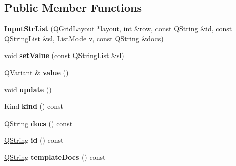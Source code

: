 \subsection*{Public Member Functions}
\begin{DoxyCompactItemize}
\item 
\mbox{\label{class_input_str_list_a2ff2afcbcd50e8425f367f2888832564}} 
{\bfseries Input\+Str\+List} (Q\+Grid\+Layout $\ast$layout, int \&row, const \mbox{\hyperlink{class_q_string}{Q\+String}} \&id, const \mbox{\hyperlink{class_q_string_list}{Q\+String\+List}} \&sl, List\+Mode v, const \mbox{\hyperlink{class_q_string}{Q\+String}} \&docs)
\item 
\mbox{\label{class_input_str_list_a353a46afd90e0897ba6dce7a13d844d8}} 
void {\bfseries set\+Value} (const \mbox{\hyperlink{class_q_string_list}{Q\+String\+List}} \&sl)
\item 
\mbox{\label{class_input_str_list_a60756f0f9f3fc4303a7c17550ae81a46}} 
Q\+Variant \& {\bfseries value} ()
\item 
\mbox{\label{class_input_str_list_a29cf7f5d0f8aab6a573179f6ab9045da}} 
void {\bfseries update} ()
\item 
\mbox{\label{class_input_str_list_acaa81938f31b3dc274297b4a874841e4}} 
Kind {\bfseries kind} () const
\item 
\mbox{\label{class_input_str_list_a387aca077624fd75912f49101f4be316}} 
\mbox{\hyperlink{class_q_string}{Q\+String}} {\bfseries docs} () const
\item 
\mbox{\label{class_input_str_list_ae7637a9bee988a857843b0bfa286b7ed}} 
\mbox{\hyperlink{class_q_string}{Q\+String}} {\bfseries id} () const
\item 
\mbox{\label{class_input_str_list_a1f89c5b32fde40663e674d0865472bc5}} 
\mbox{\hyperlink{class_q_string}{Q\+String}} {\bfseries template\+Docs} () const
\item 
\mbox{\label{class_input_str_list_a226fe44b40476b696f03492b77c6ee3f}} 

\end{DoxyCompactItemize}
